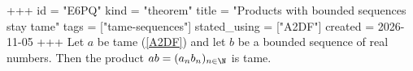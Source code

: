 +++
id = "E6PQ"
kind = "theorem"
title = "Products with bounded sequences stay tame"
tags = ["tame-sequences"]
stated_using = ["A2DF"]
created = 2026-11-05
+++
Let $a$ be tame (\ref{A2DF}) and let $b$ be a bounded sequence of real numbers. Then the product $ab = (a_n b_n)_{n \in \N}$ is tame.
